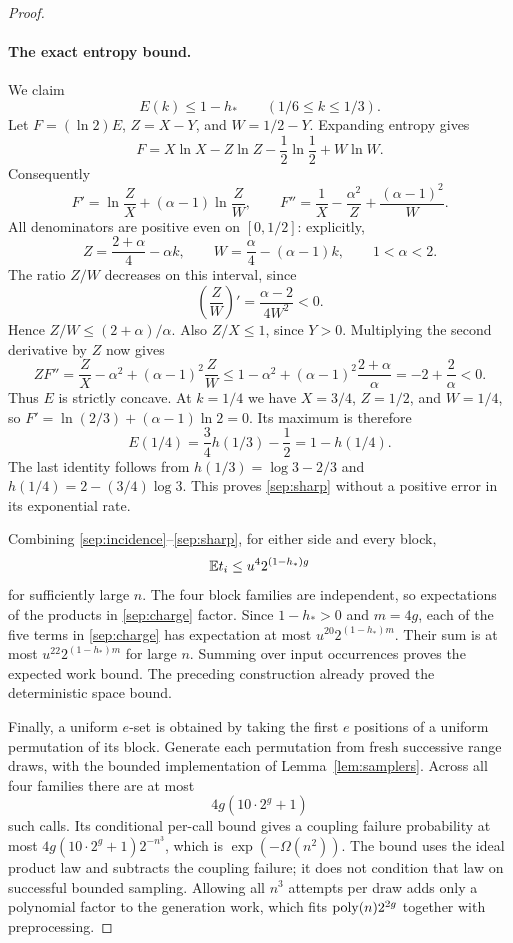 \begin{proof}
\paragraph{The exact entropy bound.}
We claim
\begin{equation}\label{sep:sharp}
 E(k)\le1-h_*\qquad(1/6\le k\le1/3).
\end{equation}
Let $F=(\ln2)E$, $Z=X-Y$, and $W=1/2-Y$. Expanding entropy gives
\[
 F=X\ln X-Z\ln Z-\frac12\ln\frac12+W\ln W.
\]
Consequently
\[
 F'=\ln\frac{Z}{X}+(\alpha-1)\ln\frac{Z}{W},
 \qquad
 F''=\frac1X-\frac{\alpha^2}{Z}
                  +\frac{(\alpha-1)^2}{W}.
\]
All denominators are positive even on $[0,1/2]$: explicitly,
\[
 Z=\frac{2+\alpha}{4}-\alpha k,
 \qquad W=\frac\alpha4-(\alpha-1)k,
 \qquad 1<\alpha<2.
\]
The ratio $Z/W$ decreases on this interval, since
\[
 \left(\frac{Z}{W}\right)'=\frac{\alpha-2}{4W^2}<0.
\]
Hence $Z/W\le(2+\alpha)/\alpha$. Also $Z/X\le1$, since
$Y>0$. Multiplying the second derivative by $Z$ now gives
\[
 ZF''=\frac{Z}{X}-\alpha^2+(\alpha-1)^2\frac{Z}{W}
 \le1-\alpha^2+(\alpha-1)^2\frac{2+\alpha}{\alpha}
 =-2+\frac2\alpha<0.
\]
Thus $E$ is strictly concave. At $k=1/4$ we have
$X=3/4$, $Z=1/2$, and $W=1/4$, so
$F'=\ln(2/3)+(\alpha-1)\ln2=0$. Its maximum is therefore
\[
 E(1/4)=\frac34h(1/3)-\frac12=1-h(1/4).
\]
The last identity follows from
$h(1/3)=\log3-2/3$ and $h(1/4)=2-(3/4)\log3$.
This proves \eqref{sep:sharp} without a positive error in its
exponential rate.

Combining \eqref{sep:incidence}--\eqref{sep:sharp}, for either
side and every block,
\[
 \mathbb E t_i\le u^4 2^{(1-h_*)g}
\]
for sufficiently large $n$. The four block families are independent,
so expectations of the products in \eqref{sep:charge} factor.
Since $1-h_*>0$ and $m=4g$, each of the five terms in
\eqref{sep:charge} has expectation at most
$u^{20}2^{(1-h_*)m}$. Their sum is at most
$u^{22}2^{(1-h_*)m}$ for large $n$. Summing over input occurrences proves the
expected work bound. The preceding construction already proved the
deterministic space bound.

Finally, a uniform $e$-set is obtained by taking the first $e$
positions of a uniform permutation of its block. Generate each
permutation from fresh successive range draws, with the bounded
implementation of Lemma~\ref{lem:samplers}. Across all four families
there are at most
\[
 4g(10\cdot2^g+1)
\]
such calls. Its conditional per-call bound gives a coupling failure
probability at most $4g(10\cdot2^g+1)2^{-n^3}$, which is
$\exp(-\Omega(n^2))$. The bound uses the ideal product law and
subtracts the coupling failure; it does not condition that law on
successful bounded sampling. Allowing all $n^3$ attempts per draw
adds only a polynomial factor to the generation work, which fits
$\operatorname{poly}(n)2^{2g}$ together with preprocessing.
\end{proof}

